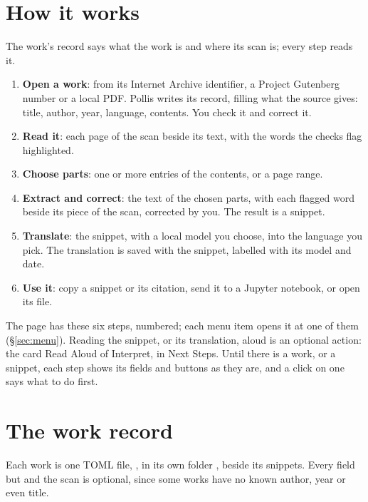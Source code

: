 \section{How it works}\label{sec:how}
The work's record says what the work is and where its scan is; every step reads it.
\begin{enumerate}
  \item \textbf{Open a work}: from its Internet Archive identifier, a Project Gutenberg number or a local PDF. Pollis
    writes its record, filling what the source gives: title, author, year, language, contents. You check it and
    correct it.
  \item \textbf{Read it}: each page of the scan beside its text, with the words the checks flag highlighted.
  \item \textbf{Choose parts}: one or more entries of the contents, or a page range.
  \item \textbf{Extract and correct}: the text of the chosen parts, with each flagged word beside its piece of the
    scan, corrected by you. The result is a snippet.
  \item \textbf{Translate}: the snippet, with a local model you choose, into the language you pick. The translation
    is saved with the snippet, labelled with its model and date.
  \item \textbf{Use it}: copy a snippet or its citation, send it to a Jupyter notebook, or open its file.
\end{enumerate}
The page has these six steps, numbered; each menu item opens it at one of them (\S\ref{sec:menu}). Reading the snippet,
or its translation, aloud is an optional action: the card Read Aloud of Interpret, in Next Steps. Until there is a work,
or a snippet, each step shows its fields and buttons as they are, and a click on one says what to do first.

\section{The work record}\label{sec:record}
Each work is one TOML file, , in its own folder , beside its snippets.
Every field but  and the scan is optional, since some works have no known author, year or even title.

